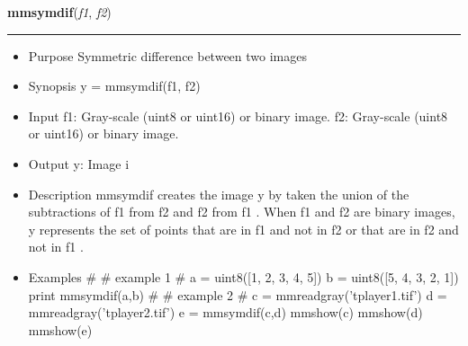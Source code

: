     \label{multireg:num_pymorph:mmsymdif}
    \vspace{0.5ex}

    \begin{boxedminipage}{\textwidth}

    \raggedright \textbf{mmsymdif}(\textit{f1}, \textit{f2})

    \vspace{-1.5ex}

    \rule{\textwidth}{0.5\fboxrule}
    \begin{itemize}
    \setlength{\parskip}{0.6ex}
      \item Purpose Symmetric difference between two images

      \item Synopsis y = mmsymdif(f1, f2)

      \item Input f1: Gray-scale (uint8 or uint16) or binary image. f2: 
        Gray-scale (uint8 or uint16) or binary image.

      \item Output y: Image i

      \item Description mmsymdif creates the image y by taken the union of 
        the subtractions of f1 from f2 and f2 from f1 . When f1 and f2 
        are binary images, y represents the set of points that are in f1 
        and not in f2 or that are in f2 and not in f1 .

      \item Examples \# \# example 1 \# a = uint8([1, 2, 3, 4, 5]) b = 
        uint8([5, 4, 3, 2, 1]) print mmsymdif(a,b) \# \# example 2 \# c = 
        mmreadgray('tplayer1.tif') d = mmreadgray('tplayer2.tif') e = 
        mmsymdif(c,d) mmshow(c) mmshow(d) mmshow(e)

    \end{itemize}

    \vspace{1ex}

    \end{boxedminipage}

    \label{multireg:num_pymorph:mmtext}
    \vspace{0.5ex}

